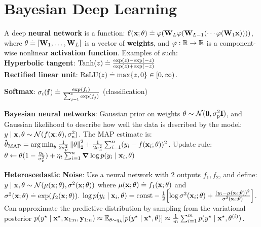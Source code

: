 \section{Bayesian Deep Learning}
\begin{framed}
    A deep \textbf{neural network} is a function: $\mathbf{f}(\mathbf{x}; \mathbf{\theta}) \overset{.}{=} \mathbf{\varphi}(\mathbf{W}_L \mathbf{\varphi}(\mathbf{W}_{L-1} ( \cdots \mathbf{\varphi}(\mathbf{W}_1 \mathbf{x}))))$, where $\mathbf{\theta} \overset{.}{=} [\mathbf{W}_1, \dots, \mathbf{W}_L]$ is a vector of \textbf{weights}, and $\varphi : \mathbb{R} \to \mathbb{R}$ is a component-wise nonlinear \textbf{activation function}. Examples of such: \\
    \textbf{Hyperbolic tangent}: $\mathrm{Tanh}(z) \overset{.}{=} \frac{\exp(z) - \exp(-z)}{\exp(z) + \exp(-z)}$ \\
    \textbf{Rectified linear unit}: $\mathrm{ReLU}(z) \overset{.}{=} \max \{z, 0\} \in [0, \infty)$.
\end{framed}
\textbf{Softmax}: $\sigma_i(\mathbf{f}) \overset{.}{=} \frac{\exp(f_i)}{\sum_{j=1}^c \exp(f_j)}$ (classification)
\begin{framed}
    \textbf{Bayesian neural networks}: Gaussian prior on weights $\vtheta \sim \N{\vzero}{\sigmap^2 \mI}$, and Gaussian likelihood to describe how well the data is described by the model: \\
    $y \mid \vx, \vtheta \sim \N{f(\vx; \vtheta)}{\sigman^2}$. The MAP estimate is: \\
    $\vthetahat_\MAP = \argmin_\vtheta \frac{1}{2 \sigmap^2} \norm{\vtheta}_2^2 + \frac{1}{2 \sigman^2} \sum_{i=1}^n (y_i - f(\vx_i; \vtheta))^2$. Update rule: $\vtheta \gets \vtheta(1 - \frac{\eta_t}{\sigmap^2}) + \eta_t \sum_{i=1}^n \grad \log p(y_i \mid \vx_i, \vtheta)$
\end{framed}
\textbf{Heteroscedastic Noise}: Use a neural network with 2 outputs $f_1, f_2$, and define: $y \mid \vx, \vtheta \sim \N{\mu(\vx; \vtheta)}{\sigma^2(\vx; \vtheta)}$ where $\mu(\mathbf{x}; \mathbf{\theta}) \overset{.}{=} f_1(\mathbf{x}; \mathbf{\theta})$ and $\sigma^2(\mathbf{x}; \mathbf{\theta}) \overset{.}{=} \exp(f_2(\mathbf{x}; \mathbf{\theta}))$.
$\log p(y_i \mid \vx_i, \vtheta) = \const - \frac{1}{2} \brackets*{\log \sigma^2(\vx_i; \vtheta) + \frac{(y_i - \mu(\vx_i; \vtheta))^2}{\sigma^2(\vx_i; \vtheta)}}$.
Can approximate the predictive distribution by sampling from the variational posterior $p(\ys \mid \vxs, \vx_{1:n}, \vy_{1:n}) \approx \E[\theta \sim q_\vlambda]{p(\ys \mid \vxs, \vtheta)}\approx \frac{1}{m} \sum_{i=1}^m p(\ys \mid \vxs, \vtheta^{(i)})$.